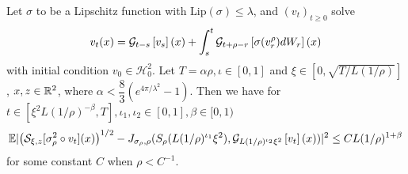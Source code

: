 \begin{theorem}
    Let $\sigma$ to be a Lipschitz function with $\text{Lip}(\sigma) \leq \lambda$, and $(v_t)_{t\geq 0}$ solve
    \[
    v_t(x) = \mathcal{G}_{t-s}\left[{v_s}\right](x) + \int_s^t\mathcal{G}_{t+\rho-r}\left[{\sigma(v_r^{\rho})dW_r}\right](x)
    \] with initial condition $v_0 \in \mathscr{H}_0^2$. Let $T = \alpha\rho,\iota \in[0,1]$ and $\xi \in [0,\sqrt{T/L(1/\rho)}]$, $x,z\in\mathbb{R}^2$, where $\alpha < \dfrac{8}{3}\left(e^{4\pi/\lambda^2}-1\right)$. Then we have for $t\in[\xi^2L(1/\rho)^{-\beta},T], \iota_1,\iota_2\in[0,1], \beta \in[0,1)$
    \[
    \mathbb{E}\lvert \left(\mathcal{S}_{\xi,z}[\sigma_{\rho}^2\circ v_t](x)\right)^{1/2} - J_{\sigma_{\rho},\rho}(S_{\rho}(L(1/\rho)^{\iota_1}\xi^2), \mathcal{G}_{L(1/\rho)^{\iota_2}\xi^2}\left[{v_t}\right](x))\rvert^2 \leq C L(1/\rho)^{1+\beta}
    \]
    for some constant $C$ when $\rho < C^{-1}$.\par
\end{theorem}
